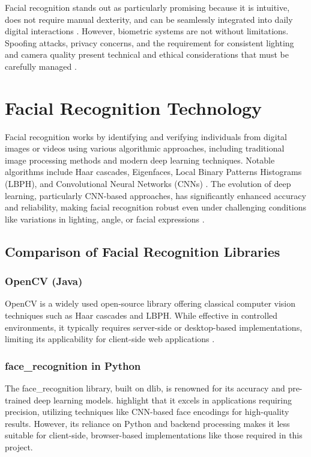 Facial recognition stands out as particularly promising because it is intuitive, does not require manual dexterity, and can be seamlessly integrated into daily digital interactions \autocite{Bhatt2011}. However, biometric systems are not without limitations. Spoofing attacks, privacy concerns, and the requirement for consistent lighting and camera quality present technical and ethical considerations that must be carefully managed \autocite{Kuznetsov2024, Bahia2024}.

\section{Facial Recognition Technology}
Facial recognition works by identifying and verifying individuals from digital images or videos using various algorithmic approaches, including traditional image processing methods and modern deep learning techniques. Notable algorithms include Haar cascades, Eigenfaces, Local Binary Patterns Histograms (LBPH), and Convolutional Neural Networks (CNNs) \autocite{ElSayed2015}. The evolution of deep learning, particularly CNN-based approaches, has significantly enhanced accuracy and reliability, making facial recognition robust even under challenging conditions like variations in lighting, angle, or facial expressions \autocite{Zhang2020}.

\subsection{Comparison of Facial Recognition Libraries}

\subsubsection{OpenCV (Java)}
OpenCV is a widely used open-source library offering classical computer vision techniques such as Haar cascades and LBPH. While effective in controlled environments, it typically requires server-side or desktop-based implementations, limiting its applicability for client-side web applications \autocite{Dominguez2017}.

\subsubsection{face\_recognition in Python}  
The face\_recognition library, built on dlib, is renowned for its accuracy and pre-trained deep learning models. \textcite{Zhang2020} highlight that it excels in applications requiring precision, utilizing techniques like CNN-based face encodings for high-quality results. However, its reliance on Python and backend processing makes it less suitable for client-side, browser-based implementations like those required in this project.

